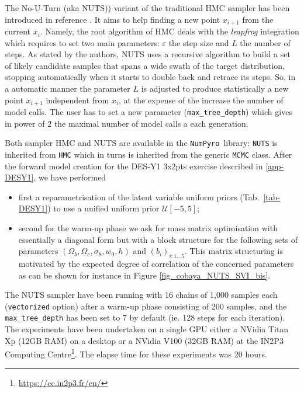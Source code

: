 \documentclass[twocolumn,twocolappendix,nofootinbib]{openjournal}
\newcommand{\numpyro}{\texttt{NumPyro}}
\begin{document}
The No-U-Turn (aka NUTS))  variant of the traditional HMC sampler has been introduced in reference \citep{nuts}. It aims to help finding a new point  $x_{i+1}$ from  the current $x_i$. Namely, the root algorithm of HMC deals with the \textit{leapfrog} integration which requires to set two main parameters: $\varepsilon$ the step size and $L$ the number of steps. As stated by the authors, NUTS  uses a recursive algorithm to build a set of likely candidate samples that spans a wide swath of the target distribution, stopping automatically when it starts to double back and retrace its steps. So, in a automatic manner the parameter $L$ is adjusted to produce statistically  a new point $x_{i+1}$ independent from $x_i$, at the expense of the increase the number of model calls. The user has to set a new  parameter  (\texttt{max\_tree\_depth}) which gives in power of $2$ the maximal number of model calls a each generation.

Both sampler HMC and NUTS are available in the \numpyro\ library: \texttt{NUTS} is inherited from \texttt{HMC} which in turns is inherited from the generic \texttt{MCMC} class.  After the forward model creation for the DES-Y1 3x2pts exercise described in \ref{app-DESY1}, we have performed 
\begin{itemize}
    \item first a reparametrisation of the latent variable uniform priors (Tab.~\ref{tab-DESY1}) to use a unified uniform prior $\mathcal{U}[-5,5]$;
    \item second for the warm-up phase we ask for mass matrix optimisation with essentially a diagonal form but with a block structure for the following sets of parameters $(\Omega_b,\Omega_c,\sigma_8,w_0,h)$ and $(b_i)_{i:1\dots5}$. This matrix structuring is motivated by the expected degree of correlation of the concerned parameters as can be shown for instance in Figure \ref{fig_cobaya_NUTS_SVI_bis}.
\end{itemize}
The NUTS sampler have been running with 16 chains of 1,000 samples each (\texttt{vectorized} option) after a warm-up phase consisting of 200 samples, and the \texttt{max\_tree\_depth} has been set to 7 by default (ie. 128 steps for each iteration). The experiments have been undertaken on a single GPU either a NVidia Titan Xp (12GB RAM) on a desktop or a NVidia V100 (32GB RAM) at the IN2P3 Computing Centre\footnote{\url{https://cc.in2p3.fr/en/}}. The elapse time for these experiments was 20 hours.
\end{document}
